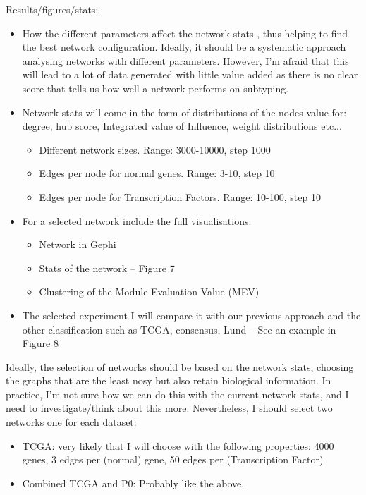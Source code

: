 Results/figures/stats:
\begin{itemize}

    \item How the different parameters affect the network stats , thus helping to find the best network configuration. Ideally, it should be a systematic approach analysing networks with different parameters. However, I’m afraid that this will lead to a lot of data generated with little value added as there is no clear score that tells us how well a network performs on subtyping.
    \item Network stats will come in the form of distributions of the nodes value for: degree, hub score, Integrated value of Influence, weight distributions etc...
          \begin{itemize}
              \item Different network sizes. Range: 3000-10000, step 1000
              \item Edges per node for normal genes. Range: 3-10, step 10
              \item Edges per node for Transcription Factors. Range: 10-100, step 10
          \end{itemize}
    \item For a selected network include the full visualisations:
          \begin{itemize}
              \item Network in Gephi
              \item Stats of the network – Figure 7
              \item Clustering of the Module Evaluation Value (MEV)
          \end{itemize}

    \item The selected experiment I will compare it with our previous approach and the other classification such as TCGA, consensus, Lund – See an example in Figure 8
\end{itemize}


Ideally, the selection of networks should be based on the network stats, choosing the graphs that are the least nosy but also retain biological information. In practice, I'm not sure how we can do this with the current network stats, and I need to investigate/think about this more. Nevertheless, I should select two networks one for each dataset:
\begin{itemize}
    \item TCGA: very likely that I will choose with the following properties: 4000 genes, 3 edges per (normal) gene, 50 edges per (Transcription Factor)
    \item Combined TCGA and P0: Probably like the above.
\end{itemize}